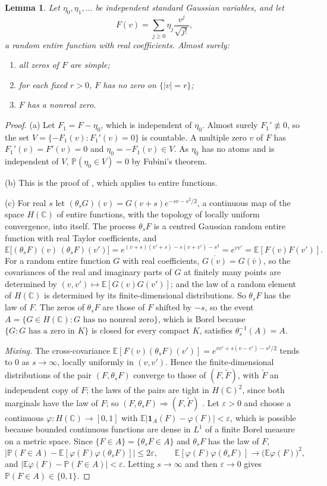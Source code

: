 \documentclass[11pt]{amsart}
\newtheorem{lemma}[theorem]{Lemma}
\theoremstyle{definition}
\theoremstyle{remark}
\numberwithin{equation}{section}
\newcommand{\C}{\mathbb{C}}
\newcommand{\E}{\mathbb{E}}
\newcommand{\PP}{\mathbb{P}}
\newcommand{\eps}{\varepsilon}
\begin{document}
\begin{lemma}\label{lem:gaf}
Let $\eta_0,\eta_1,\dots$ be independent standard Gaussian variables, and let
\[
F(v)=\sum_{j\ge0}\eta_j\frac{v^j}{\sqrt{j!}},
\]
a random entire function with real coefficients. Almost surely:
\begin{enumerate}
\item[(a)] all zeros of $F$ are simple;
\item[(b)] for each fixed $r>0$, $F$ has no zero on $\{|v|=r\}$;
\item[(c)] $F$ has a nonreal zero.
\end{enumerate}
\end{lemma}

\begin{proof}
(a) Let $F_1=F-\eta_0$, which is independent of $\eta_0$. Almost surely $F_1'\not\equiv0$, so the set $V=\{-F_1(v):F_1'(v)=0\}$ is countable. A multiple zero $v$ of $F$ has $F_1'(v)=F'(v)=0$ and $\eta_0=-F_1(v)\in V$. As $\eta_0$ has no atoms and is independent of $V$, $\PP(\eta_0\in V)=0$ by Fubini's theorem.

(b) This is the proof of \cite[Lemma~\ref{M-lem:circle}(a)]{Main}, which applies to entire functions.

(c) For real $s$ let $(\theta_sG)(v)=G(v+s)e^{-sv-s^2/2}$, a continuous map of the space $H(\C)$ of entire functions, with the topology of locally uniform convergence, into itself. The process $\theta_sF$ is a centred Gaussian random entire function with real Taylor coefficients, and
\[
\E\bigl[(\theta_sF)(v)\,(\theta_sF)(v')\bigr]=e^{(v+s)(v'+s)-s(v+v')-s^2}=e^{vv'}=\E[F(v)F(v')].
\]
For a random entire function $G$ with real coefficients, $\overline{G(v)}=G(\bar v)$, so the covariances of the real and imaginary parts of $G$ at finitely many points are determined by $(v,v')\mapsto\E[G(v)G(v')]$; and the law of a random element of $H(\C)$ is determined by its finite-dimensional distributions. So $\theta_sF$ has the law of $F$. The zeros of $\theta_sF$ are those of $F$ shifted by $-s$, so the event $A=\{G\in H(\C):G\text{ has no nonreal zero}\}$, which is Borel because $\{G:G\text{ has a zero in }K\}$ is closed for every compact $K$, satisfies $\theta_s^{-1}(A)=A$.

\emph{Mixing.} The cross-covariance $\E[F(v)(\theta_sF)(v')]=e^{vv'+s(v-v')-s^2/2}$ tends to $0$ as $s\to\infty$, locally uniformly in $(v,v')$. Hence the finite-dimensional distributions of the pair $(F,\theta_sF)$ converge to those of $(F,\widetilde F)$, with $\widetilde F$ an independent copy of $F$; the laws of the pairs are tight in $H(\C)^2$, since both marginals have the law of $F$; so $(F,\theta_sF)\Rightarrow(F,\widetilde F)$ \cite[Chapter~1]{Bi2}. Let $\eps>0$ and choose a continuous $\varphi:H(\C)\to[0,1]$ with $\E|\mathbf 1_A(F)-\varphi(F)|<\eps$, which is possible because bounded continuous functions are dense in $L^1$ of a finite Borel measure on a metric space. Since $\{F\in A\}=\{\theta_sF\in A\}$ and $\theta_sF$ has the law of $F$,
\[
\bigl|\PP(F\in A)-\E[\varphi(F)\varphi(\theta_sF)]\bigr|\le2\eps,\qquad\E[\varphi(F)\varphi(\theta_sF)]\to\bigl(\E\varphi(F)\bigr)^2 ,
\]
and $|\E\varphi(F)-\PP(F\in A)|<\eps$. Letting $s\to\infty$ and then $\eps\to0$ gives $\PP(F\in A)\in\{0,1\}$.


\end{proof}
\end{document}
